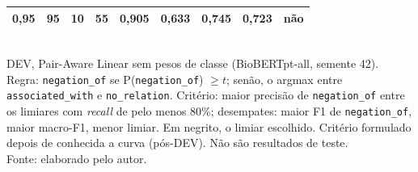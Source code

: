 \begin{table}[htbp]
{\begin{tabular}{rrrrrrrrc}
0{,}95 & 95 & 10 & 55 & 0{,}905 & 0{,}633 & 0{,}745 & 0{,}723 & não \\
  \bottomrule
  \end{tabular}}\\[2pt]
  {\footnotesize DEV, Pair-Aware Linear sem pesos de classe (BioBERTpt-all, semente 42). Regra: \texttt{negation\_of} se P(\texttt{negation\_of}) $\geq t$; senão, o argmax entre \texttt{associated\_with} e \texttt{no\_relation}. Critério: maior precisão de \texttt{negation\_of} entre os limiares com \emph{recall} de pelo menos 80\%; desempates: maior F1 de \texttt{negation\_of}, maior macro-F1, menor limiar. Em negrito, o limiar escolhido. Critério formulado depois de conhecida a curva (pós-DEV). Não são resultados de teste.}\\[4pt]
  {\footnotesize Fonte: elaborado pelo autor.}
\end{table}
